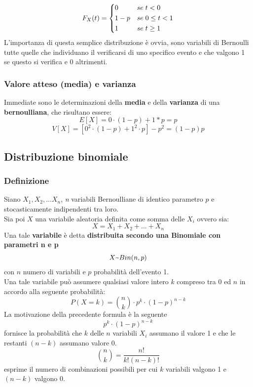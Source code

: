 \begin{equation}
F_X(t) = 
\begin{dcases}
0 & se \; t < 0 \\
1-p & se \; 0 \leq t < 1\\
1 & se \; t \geq 1
\end{dcases}
\end{equation}
L’importanza di questa semplice distribuzione è ovvia, sono variabili di Bernoulli tutte quelle che individuano il verificarsi di uno specifico evento e che valgono 1 se questo si verifica e 0 altrimenti.

\subsubsection{Valore atteso (media) e varianza}
Immediate sono le determinazioni della \textbf{media} e della \textbf{varianza} di una \textbf{bernoulliana}, che risultano essere:
\begin{equation}
	E[X] = 0 \cdot (1-p) + 1 * p = p
\end{equation}
\begin{equation}
V[X] = [0^2 \cdot (1 - p) + 1^2 \cdot p] - p^2 = (1 - p) p
\end{equation}

\subsection{Distribuzione binomiale}
\subsubsection{Definizione}
Siano $X_1, X_2, ... X_n$, \textit{n} variabili Bernoulliane di identico parametro $p$ e stocasticamente indipendenti tra loro.\\
Sia poi $X$ una variabile aleatoria definita come somma delle $X_i$ ovvero sia:
\[
X = X_1 + X_2 + ... + X_n
\]
Una tale \textbf{variabile} è detta \textbf{distribuita secondo una Binomiale con parametri n e p}
\begin{equation}
	X \textapprox Bin(n, p)
\end{equation}
con $n$ numero di variabili e $p$ probabilità dell'evento 1. \\
Una tale variabile può assumere qualsiasi valore intero $k$ compreso tra $0$ ed $n$ in accordo alla seguente probabilità:
\begin{equation}
	P(X = k) = \binom{n}{k} \cdot p^k \cdot (1-p)^{n-k}
\end{equation}
La motivazione della precedente formula è la seguente
\[
p^k \cdot (1 - p)^{n - k}
\]
fornisce la probabilità che $k$ delle $n$ variabili $X_i$ assumano il valore 1 e che le restanti $(n-k)$ assumano valore 0.
\[
\binom{n}{k} = \frac{n!}{k! (n - k)!}
\]
esprime il numero di combinazioni possibili per cui $k$ variabili valgono 1 e $(n-k)$ valgono 0.\\

